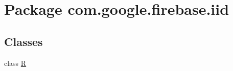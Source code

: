 \hypertarget{namespacecom_1_1google_1_1firebase_1_1iid}{}\section{Package com.\+google.\+firebase.\+iid}
\label{namespacecom_1_1google_1_1firebase_1_1iid}
\subsection*{Classes}
\begin{DoxyCompactItemize}
\item 
class \mbox{\hyperlink{classcom_1_1google_1_1firebase_1_1iid_1_1R}{R}}
\end{DoxyCompactItemize}
